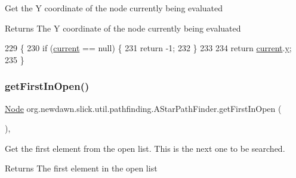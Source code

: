 Get the Y coordinate of the node currently being evaluated

\begin{DoxyReturn}{Returns}
The Y coordinate of the node currently being evaluated 
\end{DoxyReturn}

\begin{DoxyCode}
229                              \{
230         \textcolor{keywordflow}{if} (\mbox{\hyperlink{classorg_1_1newdawn_1_1slick_1_1util_1_1pathfinding_1_1_a_star_path_finder_a560430f619222a3148fd1dd01c52b6ad}{current}} == null) \{
231             \textcolor{keywordflow}{return} -1;
232         \}
233         
234         \textcolor{keywordflow}{return} \mbox{\hyperlink{classorg_1_1newdawn_1_1slick_1_1util_1_1pathfinding_1_1_a_star_path_finder_a560430f619222a3148fd1dd01c52b6ad}{current}}.\mbox{\hyperlink{classorg_1_1newdawn_1_1slick_1_1util_1_1pathfinding_1_1_a_star_path_finder_1_1_node_a926a7542d89578d05ea59a6803479355}{y}};
235     \}
\end{DoxyCode}
\mbox{\label{classorg_1_1newdawn_1_1slick_1_1util_1_1pathfinding_1_1_a_star_path_finder_acb31149ddbceaa1f0b23f211e113a54e}} 
\subsubsection{\texorpdfstring{get\+First\+In\+Open()}{getFirstInOpen()}}
{\footnotesize\ttfamily \mbox{\hyperlink{classorg_1_1newdawn_1_1slick_1_1util_1_1pathfinding_1_1_a_star_path_finder_1_1_node}{Node}} org.\+newdawn.\+slick.\+util.\+pathfinding.\+A\+Star\+Path\+Finder.\+get\+First\+In\+Open (\begin{DoxyParamCaption}{ }\end{DoxyParamCaption})\hspace{0.3cm}{\ttfamily [inline]}, {\ttfamily [protected]}}

Get the first element from the open list. This is the next one to be searched.

\begin{DoxyReturn}{Returns}
The first element in the open list 
\end{DoxyReturn}

